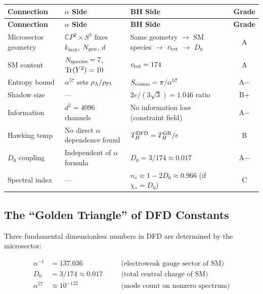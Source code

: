 \documentclass[11pt,a4paper]{article}
\begin{document}
\begin{center}
\renewcommand{\arraystretch}{1.3}
\begin{longtable}{p{3.5cm}p{4cm}p{4cm}c}
\toprule
\textbf{Connection} & \textbf{$\alpha$ Side} & \textbf{BH Side} & \textbf{Grade} \\
\midrule
\endfirsthead
\midrule
\textbf{Connection} & \textbf{$\alpha$ Side} & \textbf{BH Side} & \textbf{Grade} \\
\midrule
\endhead
\bottomrule
\endlastfoot
Microsector geometry & $\mathbb{C}P^2 \times S^3$ fixes $k_{\max}$, $N_{\rm gen}$, $d$ & Same geometry $\to$ SM species $\to$ $c_{\rm tot}$ $\to$ $D_0$ & A \\
SM content & $N_{\rm species} = 7$, ${\rm Tr}(Y^2) = 10$ & $c_{\rm tot} = 174$ & A \\
Entropy bound & $\alpha^{57}$ sets $\rho_\Lambda/\rho_{\rm Pl}$ & $S_{\rm cosmo} = \pi/\alpha^{57}$ & A$-$ \\
Shadow size & --- & $2e/(3\sqrt{3}) = 1.046$ ratio & B+ \\
Information & $d^2 = 4096$ channels & No information loss (constraint field) & A$-$ \\
Hawking temp & No direct $\alpha$ dependence found & $T_H^{\rm DFD} = T_H^{\rm GR}/e$ & B \\
$D_0$ coupling & Independent of $\alpha$ formula & $D_0 = 3/174 \approx 0.017$ & A$-$ \\
Spectral index & --- & $n_s \approx 1 - 2D_0 \approx 0.966$ (if $\chi_* = D_0$) & C \\
\end{longtable}
\end{center}

\subsection{The ``Golden Triangle'' of DFD Constants}

Three fundamental dimensionless numbers in DFD are determined by the microsector:

\begin{equation}
\begin{aligned}
\alpha^{-1} &= 137.036 \quad &&\text{(electroweak gauge sector of SM)} \\
D_0 &= 3/174 \approx 0.017 \quad &&\text{(total central charge of SM)} \\
\alpha^{57} &\approx 10^{-122} \quad &&\text{(mode count on nonzero spectrum)}
\end{aligned}
\end{equation}
\end{document}
